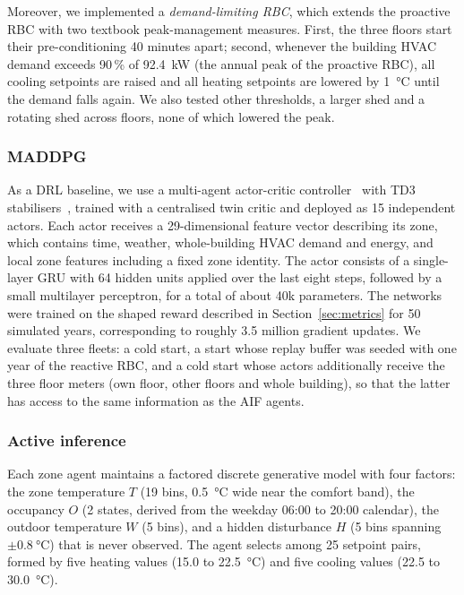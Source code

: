 \documentclass[conference]{IEEEtran}
\begin{document}
Moreover, we implemented a \emph{demand-limiting RBC}, which extends the
proactive RBC with two textbook peak-management measures. First, the three
floors start their pre-conditioning 40 minutes apart; second, whenever the
building HVAC demand exceeds 90\,\% of \SI{92.4}{\kilo\watt} (the annual peak
of the proactive RBC), all cooling setpoints are raised and all heating
setpoints are lowered by \SI{1}{\celsius} until the demand falls again. We also
tested other thresholds, a larger shed and a rotating shed across floors, none
of which lowered the peak.

\subsubsection{MADDPG}
As a DRL baseline, we use a multi-agent actor-critic
controller~\cite{lowe2017} with TD3 stabilisers~\cite{fujimoto2018}, trained
with a centralised twin critic and deployed as 15 independent actors. Each
actor receives a 29-dimensional feature vector describing its zone, which
contains time, weather, whole-building HVAC demand and energy, and local zone
features including a fixed zone identity. The actor consists of a single-layer
GRU with 64 hidden units applied over the last eight steps, followed by a small
multilayer perceptron, for a total of about 40k parameters. The networks were
trained on the shaped reward described in Section~\ref{sec:metrics} for 50
simulated years, corresponding to roughly 3.5 million gradient updates. We
evaluate three fleets: a cold start, a start whose replay buffer was seeded
with one year of the reactive RBC, and a cold start whose actors additionally
receive the three floor meters (own floor, other floors and whole building),
so that the latter has access to the same information as the AIF agents.

\subsubsection{Active inference}
Each zone agent maintains a factored discrete generative model with four
factors: the zone temperature $T$ (19 bins, \SI{0.5}{\celsius} wide near the
comfort band), the occupancy $O$ (2 states, derived from the weekday 06:00 to
20:00 calendar), the outdoor temperature $W$ (5 bins), and a hidden disturbance
$H$ (5 bins spanning $\pm\SI{0.8}{\celsius}$) that is never observed. The agent
selects among 25 setpoint pairs, formed by five heating values (15.0 to
\SI{22.5}{\celsius}) and five cooling values (22.5 to \SI{30.0}{\celsius}).
\end{document}
